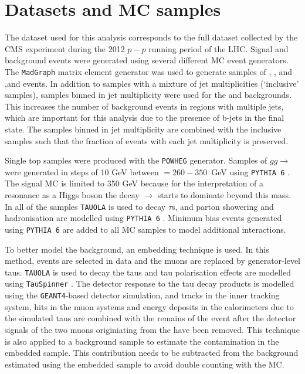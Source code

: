 \section{Datasets and \acl{MC} samples}
\label{sec:hhh_datasets}
The dataset used for this analysis corresponds to the full dataset collected by the CMS experiment during the 2012 $p-p$ 
running period of the LHC. 
Signal and background events were generated using several different \ac{MC} event generators. The \texttt{MadGraph}
\cite{madgraph} matrix element generator was used to generate samples of \Wjets, \Zellell, \ttbar and \ZZ ,\WZ and \WW
events. In addition to samples with a mixture of jet multiplicities (`inclusive' samples), samples binned in jet multiplicity
were used for the \Wjets and \Zellell backgrounds. This increases the number of background events
in regions with multiple jets, which are important for this analysis due to the presence of b-jets in the final state. 
The samples binned in jet multiplicity are combined with the
inclusive samples such that the fraction of events with each jet multiplicity is preserved.

Single top samples were produced with the \texttt{POWHEG} \cite{powheg1,powheg2} generator. Samples of $gg\rightarrow$\Htohhtobbtautau
were generated in steps of 10 GeV between \mH $= 260 - 350$~GeV using \texttt{PYTHIA 6} \cite{pythia64}. The signal
\ac{MC} is limited to 350 GeV because for the interpretation of a resonance as a Higgs boson the decay \PHiggs $\rightarrow$ \ttbar
starts to dominate beyond this mass. In all of the samples
\texttt{TAUOLA} \cite{tauola} is used to decay $\tau$s, and parton showering and hadronisation are modelled using \texttt{PYTHIA 6} \cite{pythia64}.
Minimum bias events generated using \texttt{PYTHIA 6} are added to all \ac{MC} samples to model additional
interactions. 

To better model the \Ztautau background, an embedding technique is used. In this method, 
\Zmm events are selected in data and the muons are replaced by generator-level taus. \texttt{TAUOLA} is used
to decay the taus and tau polarisation effects are modelled using \texttt{TauSpinner} \cite{TauSpinner}. The detector
response to the tau decay products is modelled using the \texttt{GEANT4}-based \cite{Geant4} detector simulation, and 
tracks in the inner tracking system, hits in the muon systems and energy deposits in the calorimeters
due to the simulated taus are combined with the remains of the \Zmm event after the detector signals
of the two muons originiating from the \PZ have been removed. This technique is also applied to 
a \ttbar background sample to estimate the \ttbar contamination in the embedded sample. This contribution
needs to be subtracted from the \Ztautau background estimated using the embedded \Zmm sample to
avoid double counting with the \ttbar \ac{MC}.

